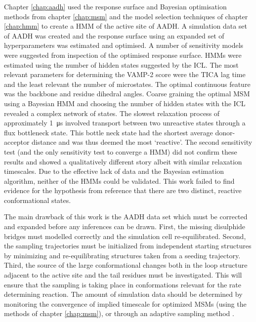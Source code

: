 Chapter \ref{chap:aadh} used the response surface and Bayesian optimisation methods from chapter \ref{chap:msm} and the model selection techniques of chapter \ref{chap:hmm} to create a HMM of the active site of AADH. A simulation data set of AADH was created and the response surface using an expanded set of hyperparameters was estimated and optimised. A number of sensitivity models were suggested from inspection of the optimised response surface. HMMs were estimated using the number of hidden states suggested by the ICL. The most relevant parameters for determining the VAMP-2 score were the TICA lag time and the least relevant the number of microstates.  The optimal continuous feature was the backbone and residue dihedral angles. Coarse graining the optimal MSM using a Bayesian HMM and choosing the number of hidden states with the ICL revealed a complex network of states. The slowest relaxation process of approximately \SI{1}{\micro\second} involved transport between two unreactive states through a flux bottleneck state. This bottle neck state had the shortest average donor-acceptor distance and was thus deemed the most `reactive'. The second sensitivity test (and the only sensitivity test to converge a HMM) did not confirm these results and showed a qualitatively different story albeit with similar relaxation timescales. Due to the effective lack of data and the Bayesian estimation algorithm, neither of the HMMs could be validated. This work failed to find evidence for the hypothesis from reference \cite{glowackiTakingOckhamRazor2012b} that there are two distinct, reactive conformational states. 

The main drawback of this work is the AADH data set which must be corrected and expanded before any inferences can be drawn. First,  the missing disulphide bridges must modelled correctly and the simulation cell re-equilibrated. Second, the sampling trajectories must be initialized from independent starting structures by minimizing and re-equilibrating structures taken from a seeding trajectory. Third, the source of the large conformational changes both in the loop structure adjacent to the active site and the tail residues must be investigated. This will ensure that the sampling is taking place in  conformations relevant for the rate determining reaction. The amount of simulation data should be determined by monitoring the convergence of implied timescale  for optimized MSMs (using the methods of chapter \ref{chap:msm}), or through an adaptive sampling method \cite{doerrOntheFlyLearningSampling2014}. 

